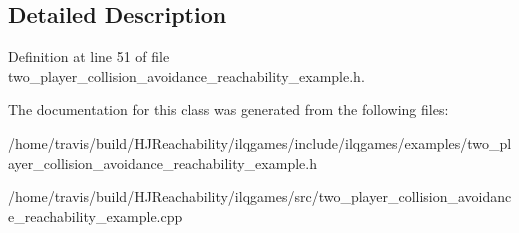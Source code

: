 \subsection{Detailed Description}


Definition at line 51 of file two\+\_\+player\+\_\+collision\+\_\+avoidance\+\_\+reachability\+\_\+example.\+h.



The documentation for this class was generated from the following files\+:\begin{DoxyCompactItemize}
\item 
/home/travis/build/\+H\+J\+Reachability/ilqgames/include/ilqgames/examples/two\+\_\+player\+\_\+collision\+\_\+avoidance\+\_\+reachability\+\_\+example.\+h\item 
/home/travis/build/\+H\+J\+Reachability/ilqgames/src/two\+\_\+player\+\_\+collision\+\_\+avoidance\+\_\+reachability\+\_\+example.\+cpp\end{DoxyCompactItemize}

